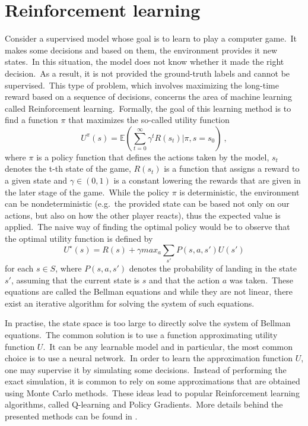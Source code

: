 \documentclass[longabstract, english, mgr]{iithesis}
\theoremstyle{default_theorem_style}\newtheorem{theorem}{Theorem}
\theoremstyle{default_theorem_style}\newtheorem{definition}{Definition}
\begin{document}
\section{Reinforcement learning}\label{sec:reinforcement_learning}

Consider a supervised model whose goal is to learn to play a computer game.\ It makes some decisions and based
on them, the environment provides it new states.\ In this situation, the model does not know whether it made the
right decision.\ As a result, it is not provided the ground-truth labels and cannot be supervised.\ This type of
problem, which involves maximizing the long-time reward based on a sequence of decisions, concerns the area of machine
learning called Reinforcement learning.\ Formally, the goal of this learning method is to find a function $\pi$ that
maximizes the so-called utility function
$$
U^{\pi}(s) = \mathbb{E}(\sum_{t=0}^{\infty} \gamma^t R(s_t) | \pi, s = s_0)\ ,
$$
where $\pi$ is a policy function that defines the actions taken by the model, $s_t$ denotes the t-th state
of the game, $R(s_t)$ is a function that assigns a reward to a given state and $\gamma \in (0, 1)$ is a constant
lowering the rewards that are given in the later stage of the game.\ While the policy $\pi$ is deterministic,
the environment can be nondeterministic (e.g.\ the provided state can be based not only on our actions, but also on
how the other player reacts), thus the expected value is applied.\ The naive way of finding the optimal policy would
be to observe that the optimal utility function is defined by
$$
U^{\star}(s) = R(s) + \gamma max_a \sum_{s'} P(s, a, s') U(s')
$$
for each $s \in S$, where $P(s, a, s')$ denotes the probability of landing in the state $s'$, assuming that the
current state is $s$ and that the action $a$ was taken.\ These equations are called the Bellman equations and while
they are not linear, there exist an iterative algorithm for solving the system of such equations.\newline

\noindent In practise, the state space is too large to directly solve the system of Bellman equations.\ The common
solution is to use a function approximating utility function $U$.\ It can be any learnable model and in
particular, the most common choice is to use a neural network.\ In order to learn the approximation function $U$, one
may supervise it by simulating some decisions.\ Instead of performing the exact simulation, it is common to rely on
some approximations that are obtained using Monte Carlo methods.\ These ideas lead to popular Reinforcement learning
algorithms, called Q-learning and Policy Gradients.\ More details behind the presented methods can be
found in \cite{reinforcement_learning_book}.
\end{document}
